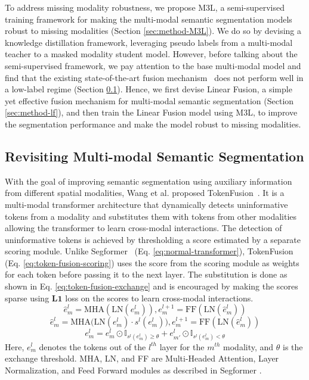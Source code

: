 \documentclass[10pt,twocolumn,letterpaper]{article}
\begin{document}
To address missing modality robustness, we propose M3L, a semi-supervised training framework for making the multi-modal semantic segmentation models robust to missing modalities (Section \ref{sec:method-M3L}). We do so by devising a knowledge distillation framework, leveraging pseudo labels from a multi-modal teacher to a masked modality student model. However, before talking about the semi-supervised framework, we pay attention to the base multi-modal model and find that the existing state-of-the-art fusion mechanism~\cite{tokenfusion} does not perform well in a low-label regime (Section \ref{sec:revisiting-mm}). Hence, we first devise Linear Fusion, a simple yet effective fusion mechanism for multi-modal semantic segmentation (Section \ref{sec:method-lf}), and then train the Linear Fusion model using M3L, to improve the segmentation performance and make the model robust to missing modalities.

\subsection{Revisiting Multi-modal Semantic Segmentation}
\label{sec:revisiting-mm}

With the goal of improving semantic segmentation using auxiliary information from different spatial modalities, Wang et al. proposed TokenFusion~\cite{tokenfusion}. It is a multi-modal transformer architecture that dynamically detects uninformative tokens from a modality and substitutes them with tokens from other modalities allowing the transformer to learn cross-modal interactions. 
The detection of uninformative tokens is achieved by thresholding a score estimated by a separate scoring module. 
Unlike Segformer~\cite{segformer} (Eq. \ref{eq:normal-transformer}), TokenFusion (Eq. \ref{eq:token-fusion-scoring}) uses the score from the scoring module as weights for each token before passing it to the next layer. The substitution is done as shown in Eq. \ref{eq:token-fusion-exchange} and is encouraged by making the scores sparse using $\mathbf{L1}$ loss on the scores to learn cross-modal interactions.
\begin{equation}
    \hat{e}_{m}^{l} = \text{MHA}(\text{LN}(e_m^l)), e_{m}^{l+1} = \text{FF}(\text{LN}(\hat{e}_{m}^{l}))
    \label{eq:normal-transformer}
\end{equation}
\begin{equation}
    \hat{e}_{m}^{l} = \text{MHA}\big(\text{LN}(e_m^l) \cdot s^l(e^l_m)\big), e_{m}^{l+1} = \text{FF}(\text{LN}(\hat{e}_{m}^{l}))
    \label{eq:token-fusion-scoring}
\end{equation}
\begin{equation}
    e_m^l = e_m^l \odot \mathbb{I}_{s^l(e^l_m) \geq \theta} + e_{m'}^l \odot \mathbb{I}_{s^l(e^l_m) < \theta}
    \label{eq:token-fusion-exchange}
\end{equation}
Here, $e_m^l$ denotes the tokens out of the $l^{th}$ layer for the $m^{th}$ modality, and $\theta$ is the exchange threshold. MHA, LN, and FF are Multi-Headed Attention, Layer Normalization, and Feed Forward modules as described in Segformer \cite{segformer}.
\end{document}
